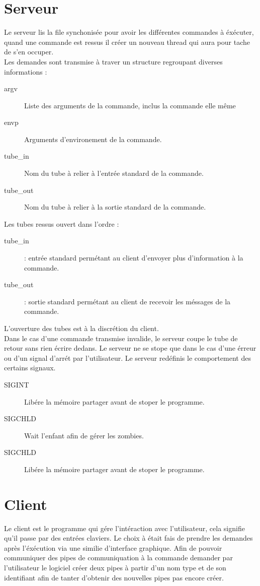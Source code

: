 \documentclass[12pt]{article}
\begin{document}
\newpage
\section{Serveur}
    Le serveur lis la file synchonisée pour avoir les différentes commandes à éxécuter, quand une commande est ressus il créer un nouveau thread qui aura pour tache de s'en occuper.\\
    Les demandes sont transmise à traver un structure regroupant diverses informations :
    \begin{description}
        \item [argv] Liste des arguments de la commande, inclus la commande elle même
        \item [envp] Arguments d'environement de la commande.
        \item [tube\_in] Nom du tube à relier à l'entrée standard de la commande.
        \item [tube\_out] Nom du tube à relier à la sortie standard de la commande.
    \end{description}
    Les tubes ressus ouvert dans l'ordre :
    \begin{description}
        \item [tube\_in]  : entrée standard permétant au client d'envoyer plus d'information à la commande.
        \item [tube\_out] : sortie standard permétant au client de recevoir les méssages de la commande.
    \end{description}
    L'ouverture des tubes est à la discrétion du client.\\
    Dans le cas d'une commande transmise invalide, le serveur coupe le tube de retour sans rien écrire dedans.
    Le serveur ne se stope que dans le cas d'une érreur ou d'un signal d'arrét par l'utilisateur.
    Le serveur redéfinis le comportement des certains signaux.
    \begin{description}
      \item [SIGINT] Libére la mémoire partager avant de stoper le programme.
      \item [SIGCHLD] Wait l'enfant afin de gérer les zombies.
      \item [SIGCHLD] Libére la mémoire partager avant de stoper le programme.
    \end{description}
\newpage
\section{Client}
    Le client est le programme qui gére l'intéraction avec l'utilisateur, cela signifie qu'il passe par des entrées claviers.
    Le choix à était fais de prendre les demandes après l'éxécution via une similie d'interface graphique.
    Afin de pouvoir communiquer des pipes de communiquation à la commande demander par l'utilisateur le logiciel créer deux pipes à partir d'un nom
    type et de son identifiant afin de tanter d'obtenir des nouvelles pipes pas encore créer.
\end{document}

